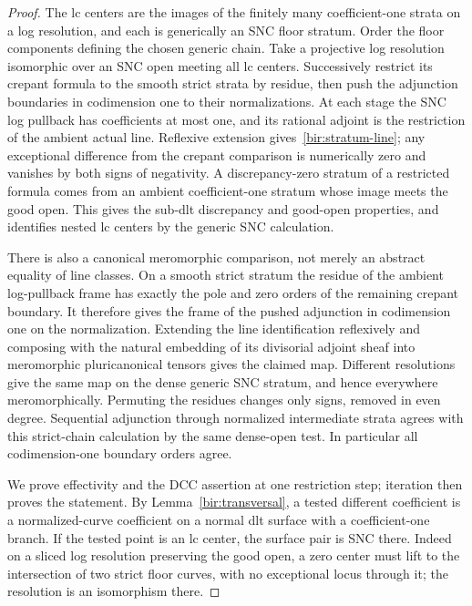 \documentclass[11pt,letterpaper]{article}
\theoremstyle{definition}
\theoremstyle{remark}
\begin{document}
\begin{proof}
The lc centers are the images of the finitely many coefficient-one
strata on a log resolution, and each is generically an SNC floor
stratum.  Order the floor components defining the chosen generic
chain.  Take a projective log resolution isomorphic over an SNC
open meeting all lc centers.  Successively restrict its crepant
formula to the smooth strict strata by residue, then push the
adjunction boundaries in codimension one to their normalizations.
At each stage the SNC log pullback has coefficients at most one,
and its rational adjoint is the restriction of the ambient actual
line.  Reflexive extension gives~\eqref{bir:stratum-line}; any
exceptional difference from the crepant comparison is numerically
zero and vanishes by both signs of negativity.  A discrepancy-zero
stratum of a restricted formula comes from an ambient
coefficient-one stratum whose image meets the good open.  This gives
the sub-dlt discrepancy and good-open properties, and identifies
nested lc centers by the generic SNC calculation.

There is also a canonical meromorphic comparison, not merely an
abstract equality of line classes.  On a smooth strict stratum the
residue of the ambient log-pullback frame has exactly the pole and
zero orders of the remaining crepant boundary.  It therefore gives
the frame of the pushed adjunction in codimension one on the
normalization.  Extending the line identification reflexively and
composing with the natural embedding of its divisorial adjoint
sheaf into meromorphic pluricanonical tensors gives the claimed
map.  Different resolutions give the same map on the dense generic
SNC stratum, and hence everywhere meromorphically.  Permuting the
residues changes only signs, removed in even degree.  Sequential
adjunction through normalized intermediate strata agrees with this
strict-chain calculation by the same dense-open test.  In
particular all codimension-one boundary orders agree.

We prove effectivity and the DCC assertion at one restriction step;
iteration then proves the statement.  By
Lemma~\ref{bir:transversal}, a tested different coefficient is a
normalized-curve coefficient on a normal dlt surface with a
coefficient-one branch.  If the tested point is an lc center, the
surface pair is SNC there.  Indeed on a sliced log resolution
preserving the good open, a zero center must lift to the intersection
of two strict floor curves, with no exceptional locus through it;
the resolution is an isomorphism there.


\end{proof}
\end{document}
